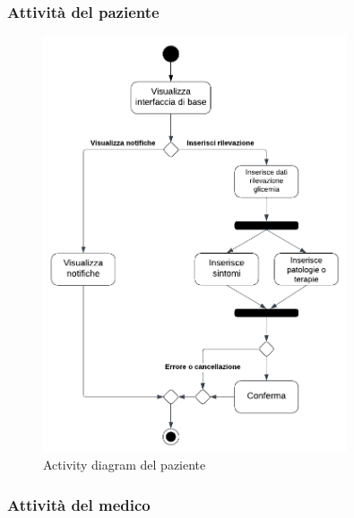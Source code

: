 \documentclass[a4paper]{article}
\begin{document}
\subsubsection{Attività del paziente}

\begin{figure}[H]
  \begin{center}
    \includegraphics[width=0.8\textwidth]{adPaziente}
  \end{center}
  \caption{Activity diagram del paziente}
  \label{fig:adPaziente}
\end{figure}

\subsubsection{Attività del medico}
\end{document}
